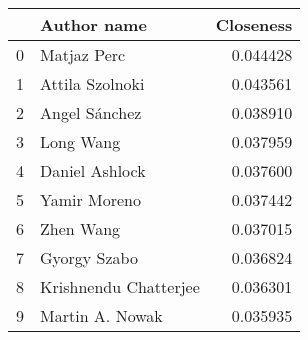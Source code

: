 \begin{tabular}{llr}
\toprule
{} &            Author name &  Closeness \\
\midrule
0 &            Matjaz Perc &   0.044428 \\
1 &        Attila Szolnoki &   0.043561 \\
2 &          Angel Sánchez &   0.038910 \\
3 &              Long Wang &   0.037959 \\
4 &         Daniel Ashlock &   0.037600 \\
5 &           Yamir Moreno &   0.037442 \\
6 &              Zhen Wang &   0.037015 \\
7 &           Gyorgy Szabo &   0.036824 \\
8 &  Krishnendu Chatterjee &   0.036301 \\
9 &        Martin A. Nowak &   0.035935 \\
\bottomrule
\end{tabular}
